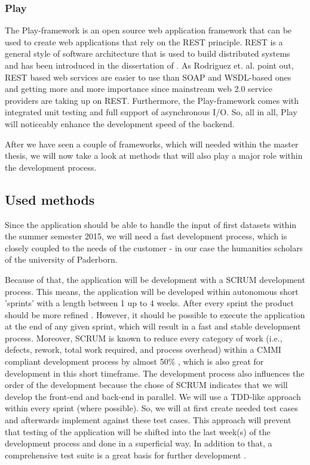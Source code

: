 \documentclass[a4page]{article}
\begin{document}
\subsubsection{Play}
The Play-framework is an open source web application framework that can be used to create web applications that rely on the \ac{REST} principle. \acf{REST} is a general style of software architecture that is used to build distributed systems and has been introduced in the dissertation of \cite{Fielding2000}. 
As Rodriguez et. al. point out, \ac{REST} based web services are easier to use than \acf{SOAP} and \acf{WSDL}-based ones and getting more and more importance since mainstream web 2.0 service providers are taking up on \ac{REST}\cite{Rodriguez2008}. Furthermore, the Play-framework comes with integrated unit testing and full support of asynchronous I/O. So, all in all, Play will noticeably enhance the development speed of the backend.

After we have seen a couple of frameworks, which will needed within the master thesis, we will now take a look at methods that will also play a major role within the development process.

\subsection{Used methods}
\label{SCRUM}
Since the application should be able to handle the input of first datasets within the summer semester 2015, we will need a fast development process, which is closely coupled to the needs of the customer - in our case the humanities scholars of the university of Paderborn. 

Because of that, the application will be development with a SCRUM development process. This means, the application will be developed within autonomous short 'sprints' with a length between 1 up to 4 weeks. After every sprint the product should be more refined \cite{scrum}. However, it should be possible to execute the application at the end of any given sprint, which will result in a fast and stable development process. Moreover, SCRUM is known to reduce every category of work (i.e., defects, rework, total work required, and process overhead) within a \ac{CMMI} compliant development process by almost 50\% \cite{Sut09}, which is also great for development in this short timeframe.
The development process also influences the order of the development because the chose of SCRUM indicates that we will develop the front-end and back-end in parallel. We will use a \ac{TDD}-like approach within every sprint (where possible). So, we will at first create needed test cases and afterwards implement against these test cases. This approach will prevent that testing of the application will be shifted into the last week(s) of the development process and done in a superficial way. In addition to that, a comprehensive test suite is a great basis for further development \cite{max03}.
\end{document}
